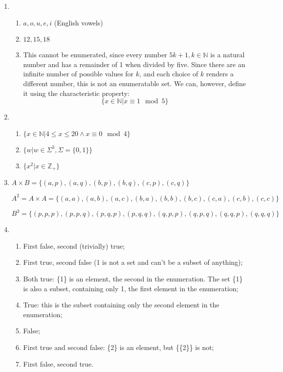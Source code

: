 \documentclass{article}
\begin{document}
\begin{enumerate}
    \item 
        \begin{enumerate}
            \item ${a, o, u, e, i}$ (English vowels)
            \item ${12,15,18}$
            \item This cannot be enumerated, since every number $5k + 1, k \in \mathbb{N}$ is a natural number and has a remainder of 1 when divided by five. Since there are an infinite number of possible values for $k$, and each choice of $k$ renders a different number, this is not an enumeratable set. We can, however, define it using the characteristic property: 
                $$\{x \in \mathbb{N} | x \equiv 1 \mod{5}\} $$
        \end{enumerate}
    \item
        \begin{enumerate}
            \item $\{ x \in \mathbb{N} | 4 \leq x \leq 20 \land x \equiv 0 \mod{4}\}$
            \item $\{ w | w \in \Sigma^3, \Sigma = \{0,1\} \}$
            \item $\{ x^2 | x \in \mathbb{Z}_+\}$
        \end{enumerate}

    \item 
        $A \times B = \{(a,p), (a,q),(b,p),(b,q), (c,p),(c,q)\}$

        $A^2 = A \times A = \{(a,a), (a,b), (a,c), (b,a), (b,b), (b,c),(c,a), (c,b), (c,c)\}$

        $B^3 =  \{ (p,p,p), (p,p,q), (p,q,p), (p,q,q), (q,p,p),(q,p,q),(q,q,p), (q,q,q)\}$

    \item
        \begin{enumerate}
            \item First false, second (trivially) true;
            \item First true, second false (1 is not a set and can't be a subset of anything);
            \item Both true: \{1\} is an element, the second in the enumeration. The set \{1\} is also a subset, containing only 1, the first element in the enumeration;
            \item True: this is the subset containing only the second element in the enumeration;
            \item False;
            \item First true and second false: \{2\} is an element, but \{\{2\}\} is not;
            \item First false, second true.
        \end{enumerate}


\end{enumerate}
\end{document}
